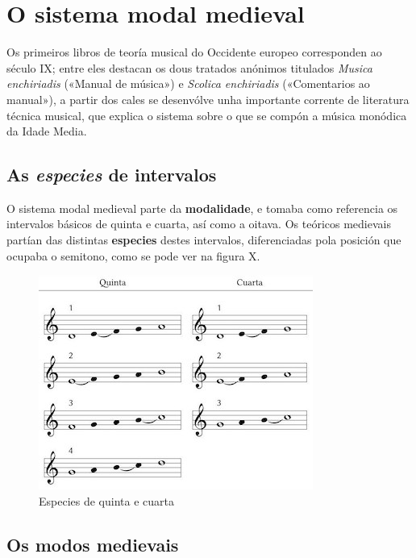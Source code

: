 \documentclass[spanish, a4paper,nobind]{templates/ociamthesis}
\begin{document}
\hypertarget{o-sistema-modal-medieval}{%
\section*{O sistema modal medieval}\label{o-sistema-modal-medieval}}

Os primeiros libros de teoría musical do Occidente europeo corresponden ao século IX; entre eles destacan os dous tratados anónimos titulados \emph{Musica enchiriadis} («Manual de música») e \emph{Scolica enchiriadis} («Comentarios ao manual»), a partir dos cales se desenvólve unha importante corrente de literatura técnica musical, que explica o sistema sobre o que se compón a música monódica da Idade Media.

\hypertarget{as-especies-de-intervalos}{%
\subsection*{\texorpdfstring{As \emph{especies} de intervalos}{As especies de intervalos}}\label{as-especies-de-intervalos}}

O sistema modal medieval parte da \textbf{modalidade}, e tomaba como referencia os intervalos básicos de quinta e cuarta, así como a oitava. Os teóricos medievais partían das distintas \textbf{especies} destes intervalos, diferenciadas pola posición que ocupaba o semitono, como se pode ver na figura X.

\begin{figure}
\centering
\includegraphics{figures/ud-03/especies.jpg}
\caption{Especies de quinta e cuarta}
\end{figure}

\hypertarget{os-modos-medievais}{%
\subsection*{Os modos medievais}\label{os-modos-medievais}}
\end{document}
